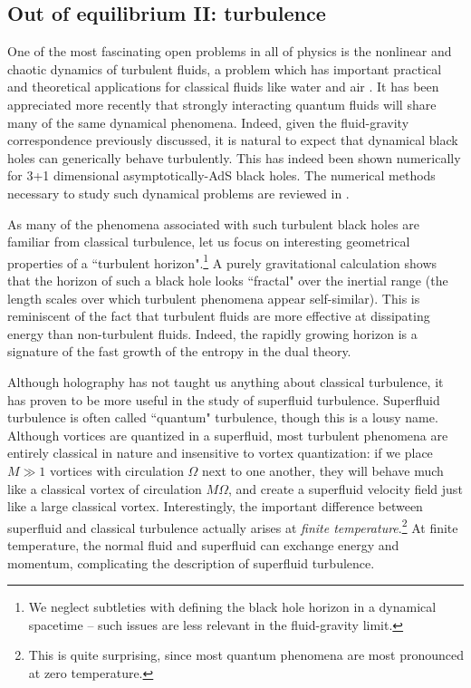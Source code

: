 \documentclass[10pt, oneside]{book}
\begin{document}
\begin{doublespace}
\subsection{Out of equilibrium II:  turbulence}
One of the most fascinating open problems in all of physics is the nonlinear and chaotic dynamics of turbulent fluids, a problem which has important practical and theoretical applications for classical fluids like water and air \cite{davidson}.  It has been appreciated more recently that strongly interacting quantum fluids will share many of the same dynamical phenomena.   Indeed, given the fluid-gravity correspondence previously discussed, it is natural to expect that dynamical black holes can generically behave turbulently.   This has indeed been shown numerically \cite{Adams:2013vsa, Green:2013zba} for 3+1 dimensional asymptotically-AdS black holes.   The numerical methods necessary to study such dynamical problems are reviewed in \cite{Chesler:2013lia}.

As many of the phenomena associated with such turbulent black holes are familiar from classical turbulence, let us focus on interesting geometrical properties of a ``turbulent horizon".\footnote{We neglect subtleties with defining the black hole horizon in a dynamical spacetime -- such issues are less relevant in the fluid-gravity limit. \par}   A purely gravitational calculation \cite{Adams:2013vsa} shows that the horizon of such a black hole looks ``fractal" over the inertial range (the length scales over which turbulent phenomena appear self-similar).   This is reminiscent of the fact that turbulent fluids are more effective at dissipating energy than non-turbulent fluids.   Indeed, the rapidly growing horizon is a signature of the fast growth of the entropy in the dual theory.

Although holography has not taught us anything about classical turbulence,  it has proven to be more useful in the study of superfluid turbulence.   Superfluid turbulence is often called ``quantum" turbulence,  though this is a lousy name.    Although vortices are quantized in a superfluid, most turbulent phenomena are entirely classical in nature and insensitive to vortex quantization:  if we place $M\gg 1$ vortices with circulation $\Omega$ next to one another, they will behave much like a classical vortex of circulation $M\Omega$, and create a superfluid velocity field just like a large classical vortex.    Interestingly, the important difference between superfluid and classical turbulence actually arises at \emph{finite temperature}.\footnote{This is quite surprising, since most quantum phenomena are most pronounced at zero temperature.}    At finite temperature, the normal fluid and superfluid can exchange energy and momentum, complicating the description of superfluid turbulence.


\end{doublespace}
\end{document}
